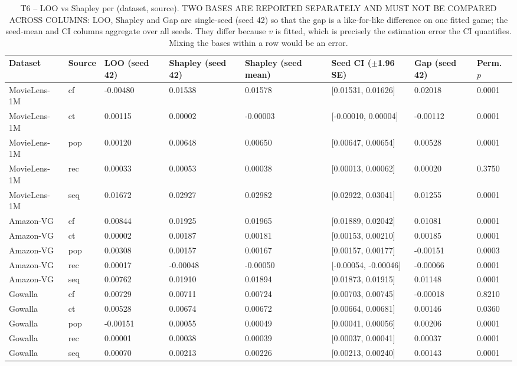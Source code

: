 \begin{table}[htbp]
\centering
\footnotesize
\caption{T6 -- LOO vs Shapley per (dataset, source). TWO BASES ARE REPORTED SEPARATELY AND MUST NOT BE COMPARED ACROSS COLUMNS: LOO, Shapley and Gap are single-seed (seed 42) so that the gap is a like-for-like difference on one fitted game; the seed-mean and CI columns aggregate over all seeds. They differ because $v$ is fitted, which is precisely the estimation error the CI quantifies. Mixing the bases within a row would be an error.}
\label{tab:T6_loo_vs_shapley}
\begin{tabular}{llllllll}
\toprule
Dataset & Source & LOO (seed 42) & Shapley (seed 42) & Shapley (seed mean) & Seed CI ($\pm$1.96 SE) & Gap (seed 42) & Perm. $p$ \\
\midrule
MovieLens-1M & cf & -0.00480 & 0.01538 & 0.01578 & [0.01531, 0.01626] & 0.02018 & 0.0001 \\
MovieLens-1M & ct & 0.00115 & 0.00002 & -0.00003 & [-0.00010, 0.00004] & -0.00112 & 0.0001 \\
MovieLens-1M & pop & 0.00120 & 0.00648 & 0.00650 & [0.00647, 0.00654] & 0.00528 & 0.0001 \\
MovieLens-1M & rec & 0.00033 & 0.00053 & 0.00038 & [0.00013, 0.00062] & 0.00020 & 0.3750 \\
MovieLens-1M & seq & 0.01672 & 0.02927 & 0.02982 & [0.02922, 0.03041] & 0.01255 & 0.0001 \\
Amazon-VG & cf & 0.00844 & 0.01925 & 0.01965 & [0.01889, 0.02042] & 0.01081 & 0.0001 \\
Amazon-VG & ct & 0.00002 & 0.00187 & 0.00181 & [0.00153, 0.00210] & 0.00185 & 0.0001 \\
Amazon-VG & pop & 0.00308 & 0.00157 & 0.00167 & [0.00157, 0.00177] & -0.00151 & 0.0003 \\
Amazon-VG & rec & 0.00017 & -0.00048 & -0.00050 & [-0.00054, -0.00046] & -0.00066 & 0.0001 \\
Amazon-VG & seq & 0.00762 & 0.01910 & 0.01894 & [0.01873, 0.01915] & 0.01148 & 0.0001 \\
Gowalla & cf & 0.00729 & 0.00711 & 0.00724 & [0.00703, 0.00745] & -0.00018 & 0.8210 \\
Gowalla & ct & 0.00528 & 0.00674 & 0.00672 & [0.00664, 0.00681] & 0.00146 & 0.0360 \\
Gowalla & pop & -0.00151 & 0.00055 & 0.00049 & [0.00041, 0.00056] & 0.00206 & 0.0001 \\
Gowalla & rec & 0.00001 & 0.00038 & 0.00039 & [0.00037, 0.00041] & 0.00037 & 0.0001 \\
Gowalla & seq & 0.00070 & 0.00213 & 0.00226 & [0.00213, 0.00240] & 0.00143 & 0.0001 \\
\bottomrule
\end{tabular}
\end{table}
